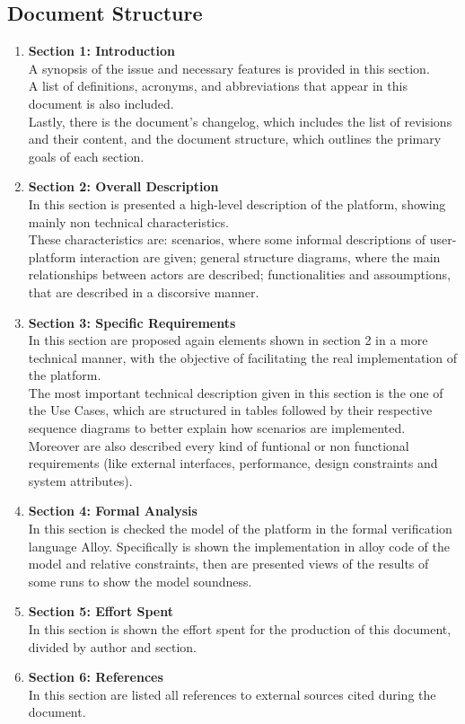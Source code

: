 \subsection{Document Structure}
\begin{enumerate}[label=$\bullet$]
    \item \textbf{Section 1: Introduction}\\
    A synopsis of the issue and necessary features is provided in this section.\\
    A list of definitions, acronyms, and abbreviations that appear in this document is also included.\\
    Lastly, there is the document's changelog, which includes the list of revisions and their content, and the document structure, which outlines the primary goals of each section.
    \item \textbf{Section 2: Overall Description}\\
    In this section is presented a high-level description of the platform, showing mainly non technical characteristics.\\
    These characteristics are: 
    scenarios, where some informal descriptions of user-platform interaction are given; 
    general structure diagrams, where the main relationships between actors are described; 
    functionalities and assoumptions, that are described in a discorsive manner.\\
    \item \textbf{Section 3: Specific Requirements}\\
    In this section are proposed again elements shown in section 2 in a more technical manner, with the objective of facilitating the real implementation of the platform.\\
    The most important technical description given in this section is the one of the Use Cases, which are structured in tables followed by their respective sequence diagrams to better explain how scenarios are implemented.\\
    Moreover are also described every kind of funtional or non functional requirements (like external interfaces, performance, design constraints and system attributes).
    \item \textbf{Section 4: Formal Analysis}\\
    In this section is checked the model of the platform in the formal verification language Alloy.
    Specifically is shown the implementation in alloy code of the model and relative constraints, then are presented views of the results of some runs to show the model soundness.
    \item \textbf{Section 5: Effort Spent}\\
    In this section is shown the effort spent for the production of this document, divided by author and section.
    \item \textbf{Section 6: References}\\
    In this section are listed all references to external sources cited during the document.


\end{enumerate}

\newpage